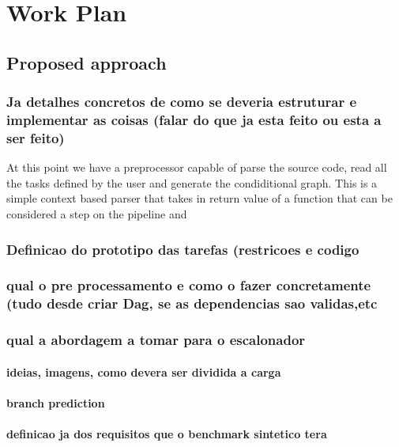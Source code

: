\chapter{Work Plan}
\section{Proposed approach}
\subsection{Ja detalhes concretos de como se deveria estruturar e implementar as coisas (falar do que ja esta feito ou esta a ser feito)}
At this point we have a preprocessor capable of parse the source code, read all the tasks defined by the user and generate the condiditional graph. This is a simple context based parser that takes in return value of a function that can be considered a step on the pipeline and 
\subsection{Definicao do prototipo das tarefas (restricoes e codigo}
\subsection{qual o pre processamento e como o fazer concretamente (tudo desde criar Dag, se as dependencias sao validas,etc}
\subsection{qual a abordagem a tomar para o escalonador}
\subsubsection{ideias, imagens, como devera ser dividida a carga}
\subsubsection{branch prediction}
\subsubsection{definicao ja dos requisitos que o benchmark sintetico tera}
